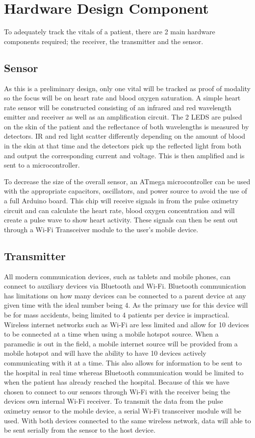 
\section{Hardware Design Component}

To adequately track the vitals of a patient, there are 2 main hardware components required; the receiver, the transmitter and the sensor.

\subsection{Sensor}
As this is a preliminary design, only one vital will be tracked as proof of modality so the focus will be on heart rate and blood oxygen saturation.
A simple heart rate sensor will be constructed consisting of an infrared and red wavelength emitter and receiver as well as an amplification circuit.
The 2 LEDS are pulsed on the skin of the patient and the reflectance of both wavelengths is measured by detectors. IR and red light scatter differently
depending on the amount of blood in the skin at that time and the detectors pick up the reflected light from both and output the corresponding current and
voltage. This is then amplified and is sent to a microcontroller.

To decrease the size of the overall sensor, an ATmega microcontroller can be used with the appropriate capacitors, oscillators, and power source to avoid the
use of a full Arduino board. This chip will receive signals in from the pulse oximetry circuit and can calculate the heart rate, blood oxygen concentration and
 will create a pulse wave to show heart activity. These signals can then be sent out through a Wi-Fi Transceiver module to the user’s mobile device.
 \subsection{Transmitter}
 All modern communication devices, such as tablets and mobile phones, can connect to auxiliary devices via Bluetooth and Wi-Fi. Bluetooth communication has
 limitations on how many devices can be connected to a parent device at any given time with the ideal number being 4. \cite{apple1} As the primary use for this device
  will be for mass accidents, being limited to 4 patients per device is impractical. Wireless internet networks such as Wi-Fi are less limited and allow for
  10 devices to be connected at a time when using a mobile hotspot source. When a paramedic is out in the field, a mobile internet source will be provided
  from a mobile hotspot and will have the ability to have 10 devices actively communicating with it at a time. This also allows for information to be sent to
  the hospital in real time whereas Bluetooth communication would be limited to when the patient has already reached the hospital. Because of this we have
  chosen to connect to our sensors through Wi-Fi with the receiver being the devices own internal Wi-Fi receiver.
 To transmit the data from the pulse oximetry sensor to the mobile device, a serial Wi-Fi transceiver module will be used. With both devices connected to
 the same wireless network, data will able to be sent serially from the sensor to the host device.
